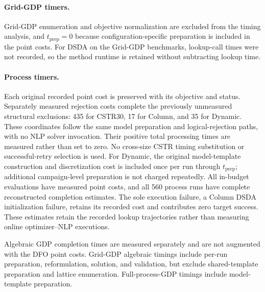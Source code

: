 \documentclass{article}
\begin{document}
\paragraph{Grid-GDP timers.}
Grid-GDP enumeration and objective normalization are excluded from the timing analysis, and $t_{\mathrm{prep}}=0$ because configuration-specific preparation is included in the point costs.
For DSDA on the Grid-GDP benchmarks, lookup-call times were not recorded, so the method runtime is retained without subtracting lookup time.

\paragraph{Process timers.}
Each original recorded point cost is preserved with its objective and status. Separately measured rejection costs complete the previously unmeasured structural exclusions: 435 for CSTR30, 17 for Column, and 35 for Dynamic.
These coordinates follow the same model preparation and logical-rejection paths, with no NLP solver invocation. Their positive total processing times are measured rather than set to zero.
No cross-size CSTR timing substitution or successful-retry selection is used.
For Dynamic, the original model-template construction and discretization cost is included once per run through $t_{\mathrm{prep}}$; additional campaign-level preparation is not charged repeatedly.
All in-budget evaluations have measured point costs, and all 560 process runs have complete reconstructed completion estimates. The sole execution failure, a Column DSDA initialization failure, retains its recorded cost and contributes zero target success.
These estimates retain the recorded lookup trajectories rather than measuring online optimizer--NLP executions.

Algebraic GDP completion times are measured separately and are not augmented with the DFO point costs.
Grid-GDP algebraic timings include per-run preparation, reformulation, solution, and validation, but exclude shared-template preparation and lattice enumeration.
Full-process-GDP timings include model-template preparation.
\end{document}
